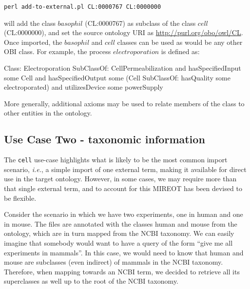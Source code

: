 \documentclass{ao2e}%
\begin{document}
\begin{footnotesize}
\begin{verbatim}
perl add-to-external.pl CL:0000767 CL:0000000 
\end{verbatim}
\end{footnotesize}

will add the class $basophil$ (CL:0000767) as subclass of the class $cell$  (CL:0000000), and set the source ontology URI as \url{http://purl.org/obo/owl/CL}.
Once imported, the $basophil$ and $cell$ classes can be used as would be any other OBI class. For example, the process $electroporation$ is defined as:

\begin{footnotesize}
\begin{verbatimtab}
Class: Electroporation
    SubClassOf: CellPermeabilization
		        and hasSpecifiedInput some Cell
			and hasSpecifiedOutput some (Cell SubClassOf: hasQuality some electroporated)
			and utilizesDevice some powerSupply	
\end{verbatimtab}
\end{footnotesize}

More generally, additional axioms may be used to relate members of the class to other entities in the ontology.


\subsection*{Use Case Two - taxonomic information}

The \texttt{cell} use-case highlights what is likely to be the most common import scenario, \emph{i.e.}, a simple import of one external term, making it available for direct use in the target ontology.
However, in some cases, we may require more than that single external term, and to account for this \ac{MIREOT} has been devised to be flexible.

Consider the scenario in which we have two experiments, one in human and one in mouse. 
The files are annotated with the classes human and mouse from the ontology, which are in turn mapped from the NCBI taxonomy. 
We can easily imagine that somebody would want to have a query of the form ``give me all 
experiments in mammals''. In this case, we would need to know that human and mouse are 
subclasses (even indirect) of mammals in the NCBI taxonomy. Therefore, when mapping 
towards an NCBI term, we decided to retrieve all its superclasses as well up to the root of the 
NCBI taxonomy.
\end{document}
